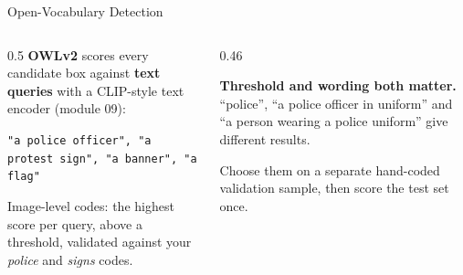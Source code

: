 \begin{frame}{Open-Vocabulary Detection}
\begin{columns}[T]
\begin{column}{0.5\textwidth}
\textbf{OWLv2} scores every candidate box against \textbf{text queries} with a CLIP-style text
encoder (module 09):

\vspace{0.1cm}
{\footnotesize\texttt{"a police officer", "a protest sign", "a banner", "a flag"}}

\vspace{0.15cm}
Image-level codes: the highest score per query, above a threshold, validated against your
\emph{police} and \emph{signs} codes.
\end{column}
\begin{column}{0.46\textwidth}
\begin{warnbox}
\textbf{Threshold and wording both matter.} ``police'', ``a police officer in uniform'' and ``a
person wearing a police uniform'' give different results.
\end{warnbox}
\begin{greenbox}
Choose them on a separate hand-coded validation sample, then score the test set once.
\end{greenbox}
\end{column}
\end{columns}
\end{frame}

